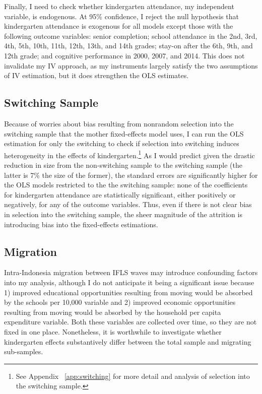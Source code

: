 Finally, I need to check whether kindergarten attendance, my independent variable, is endogenous. At 95\% confidence, I reject the null hypothesis that kindergarten attendance is exogenous for all models except those with the following outcome variables: senior completion; school attendance in the 2nd, 3rd, 4th, 5th, 10th, 11th, 12th, 13th, and 14th grades; stay-on after the 6th, 9th, and 12th grade; and cognitive performance in 2000, 2007, and 2014. This does not invalidate my IV approach, as my instruments largely satisfy the two assumptions of IV estimation, but it does strengthen the OLS estimates.

	\subsection{Switching Sample}
		\label{app:switching_ols}
Because of worries about bias resulting from nonrandom selection into the switching sample that the mother fixed-effects model uses, I can run the OLS estimation for only the switching to check if selection into switching induces heterogeneity in the effects of kindergarten.\footnote{See Appendix ~\ref{app:switching} for more detail and analysis of selection into the switching sample.} As I would predict given the drastic reduction in size from the non-switching sample to the switching sample (the latter is 7\% the size of the former), the standard errors are significantly higher for the OLS models restricted to the the switching sample: none of the coefficients for kindergarten attendance are statistically significant, either positively or negatively, for any of the outcome variables. Thus, even if there is not clear bias in selection into the switching sample, the sheer magnitude of the attrition is introducing bias into the fixed-effects estimations.

	\subsection{Migration}
	\label{app:mig}
Intra-Indonesia migration between IFLS waves may introduce confounding factors into my analysis, although I do not anticipate it being a significant issue because 1) improved educational opportunities resulting from moving would be absorbed by the schools per 10,000 variable and 2) improved economic opportunities resulting from moving would be absorbed by the household per capita expenditure variable. Both these variables are collected over time, so they are not fixed in one place. Nonetheless, it is worthwhile to investigate whether kindergarten effects substantively differ between the total sample and migrating sub-samples. 

